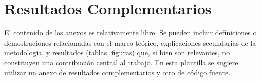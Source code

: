\chapter{Resultados Complementarios}\label{chap:AnexoA}

El contenido de los anexos es relativamente libre. Se pueden incluir definiciones o demostraciones relacionadas con el marco teórico, explicaciones secundarias de la metodología, y resultados (tablas, figuras) que, si bien son relevantes, no constituyen una contribución central al trabajo. En esta plantilla se sugiere utilizar un anexo de resultados complementarios y otro de código fuente.